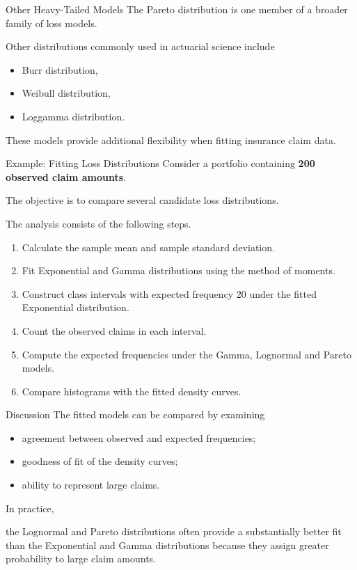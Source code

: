 \documentclass[
  ignorenonframetext,
  aspectratio=169,
]{beamer}
\providecommand{\tightlist}{%
  \setlength{\itemsep}{0pt}\setlength{\parskip}{0pt}}
\begin{document}
\begin{frame}{Other Heavy-Tailed Models}
\protect{}\label{other-heavy-tailed-models}
The Pareto distribution is one member of a broader family of loss
models.

Other distributions commonly used in actuarial science include

\begin{itemize}
\tightlist
\item
  Burr distribution,
\item
  Weibull distribution,
\item
  Loggamma distribution.
\end{itemize}

These models provide additional flexibility when fitting insurance claim
data.
\end{frame}

\begin{frame}{Example: Fitting Loss Distributions}
\protect{}\label{example-fitting-loss-distributions}
Consider a portfolio containing \textbf{200 observed claim amounts}.

The objective is to compare several candidate loss distributions.

The analysis consists of the following steps.

\begin{enumerate}
\tightlist
\item
  Calculate the sample mean and sample standard deviation.
\item
  Fit Exponential and Gamma distributions using the method of moments.
\item
  Construct class intervals with expected frequency 20 under the fitted
  Exponential distribution.
\item
  Count the observed claims in each interval.
\item
  Compute the expected frequencies under the Gamma, Lognormal and Pareto
  models.
\item
  Compare histograms with the fitted density curves.
\end{enumerate}
\end{frame}

\begin{frame}{Discussion}
\protect{}\label{discussion}
The fitted models can be compared by examining

\begin{itemize}
\tightlist
\item
  agreement between observed and expected frequencies;
\item
  goodness of fit of the density curves;
\item
  ability to represent large claims.
\end{itemize}

In practice,

the Lognormal and Pareto distributions often provide a substantially
better fit than the Exponential and Gamma distributions because they
assign greater probability to large claim amounts.
\end{frame}
\end{document}
